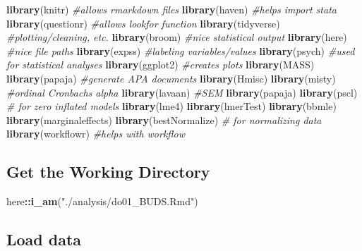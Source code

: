 \documentclass[
]{article}
\newenvironment{Shaded}{\begin{snugshade}}{\end{snugshade}}
\newcommand{\CommentTok}[1]{\textcolor[rgb]{0.56,0.35,0.01}{\textit{#1}}}
\newcommand{\FunctionTok}[1]{\textcolor[rgb]{0.13,0.29,0.53}{\textbf{#1}}}
\newcommand{\NormalTok}[1]{#1}
\newcommand{\SpecialCharTok}[1]{\textcolor[rgb]{0.81,0.36,0.00}{\textbf{#1}}}
\newcommand{\StringTok}[1]{\textcolor[rgb]{0.31,0.60,0.02}{#1}}
\begin{document}
\begin{Shaded}
\begin{Highlighting}[]
  \FunctionTok{library}\NormalTok{(knitr)      }\CommentTok{\#allows rmarkdown files}
  \FunctionTok{library}\NormalTok{(haven)      }\CommentTok{\#helps import stata}
  \FunctionTok{library}\NormalTok{(questionr)  }\CommentTok{\#allows lookfor function}
  \FunctionTok{library}\NormalTok{(tidyverse)  }\CommentTok{\#plotting/cleaning, etc.}
  \FunctionTok{library}\NormalTok{(broom)      }\CommentTok{\#nice statistical output}
  \FunctionTok{library}\NormalTok{(here)       }\CommentTok{\#nice file paths}
  \FunctionTok{library}\NormalTok{(expss)      }\CommentTok{\#labeling variables/values}
  \FunctionTok{library}\NormalTok{(psych)      }\CommentTok{\#used for statistical analyses}
  \FunctionTok{library}\NormalTok{(ggplot2)    }\CommentTok{\#creates plots}
  \FunctionTok{library}\NormalTok{(MASS)}
  \FunctionTok{library}\NormalTok{(papaja)     }\CommentTok{\#generate APA documents}
  \FunctionTok{library}\NormalTok{(Hmisc)}
  \FunctionTok{library}\NormalTok{(misty)      }\CommentTok{\#ordinal Cronbach\textquotesingle{}s alpha}
  \FunctionTok{library}\NormalTok{(lavaan)     }\CommentTok{\#SEM}
  \FunctionTok{library}\NormalTok{(papaja)}
  \FunctionTok{library}\NormalTok{(pscl)       }\CommentTok{\# for zero inflated models}
  \FunctionTok{library}\NormalTok{(lme4)}
  \FunctionTok{library}\NormalTok{(lmerTest)}
  \FunctionTok{library}\NormalTok{(bbmle)}
  \FunctionTok{library}\NormalTok{(marginaleffects)}
  \FunctionTok{library}\NormalTok{(bestNormalize) }\CommentTok{\# for normalizing data}
  \FunctionTok{library}\NormalTok{(workflowr)  }\CommentTok{\#helps with workflow}
\end{Highlighting}
\end{Shaded}

\hypertarget{get-the-working-directory}{%
\subsection{Get the Working Directory}\label{get-the-working-directory}}

\begin{Shaded}
\begin{Highlighting}[]
\NormalTok{  here}\SpecialCharTok{::}\FunctionTok{i\_am}\NormalTok{(}\StringTok{"./analysis/do01\_BUDS.Rmd"}\NormalTok{)}
\end{Highlighting}
\end{Shaded}

\hypertarget{load-data}{%
\subsection{Load data}\label{load-data}}
\end{document}
